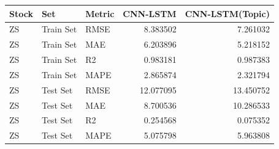 \begin{tabular}{lllrr}
\toprule
Stock & Set & Metric & CNN-LSTM & CNN-LSTM(Topic) \\
\midrule
ZS & Train Set & RMSE & 8.383502 & 7.261032 \\
ZS & Train Set & MAE & 6.203896 & 5.218152 \\
ZS & Train Set & R2 & 0.983181 & 0.987383 \\
ZS & Train Set & MAPE & 2.865874 & 2.321794 \\
ZS & Test Set & RMSE & 12.077095 & 13.450752 \\
ZS & Test Set & MAE & 8.700536 & 10.286533 \\
ZS & Test Set & R2 & 0.254568 & 0.075352 \\
ZS & Test Set & MAPE & 5.075798 & 5.963808 \\
\bottomrule
\end{tabular}
